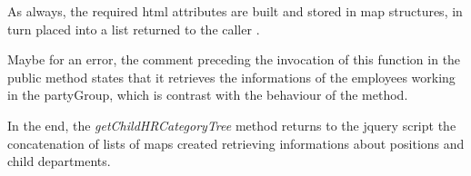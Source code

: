 As always, the required html attributes are built and stored in map structures, in turn placed into a list returned to the caller
.

Maybe for an error, the comment preceding the invocation of this function in the public method states that it retrieves the informations of the employees working in the partyGroup, which is contrast with the behaviour of the method.

In the end, the \textit{getChildHRCategoryTree} method returns to the jquery script the concatenation of lists of maps created retrieving informations about positions and child departments.
 
